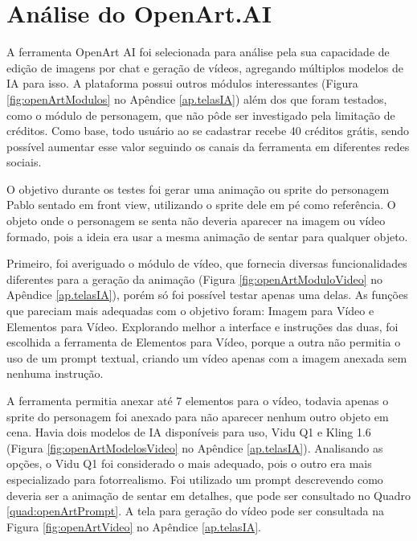 \FloatBarrier
\section{Análise do OpenArt.AI}
\label{s.openArt}

A ferramenta OpenArt AI foi selecionada para análise pela sua capacidade de edição de imagens por chat e geração de vídeos, agregando múltiplos modelos de IA para isso. A plataforma possui outros módulos interessantes (Figura \ref{fig:openArtModulos} no Apêndice \ref{ap.telasIA}) além dos que foram testados, como o módulo de personagem, que não pôde ser investigado pela limitação de créditos. Como base, todo usuário ao se cadastrar recebe 40 créditos grátis, sendo possível aumentar esse valor seguindo os canais da ferramenta em diferentes redes sociais.

O objetivo durante os testes foi gerar uma animação ou sprite do personagem Pablo sentado em front view, utilizando o sprite dele em pé como referência. O objeto onde o personagem se senta não deveria aparecer na imagem ou vídeo formado, pois a ideia era usar a mesma animação de sentar para qualquer objeto.

Primeiro, foi averiguado o módulo de vídeo, que fornecia diversas funcionalidades diferentes para a geração da animação (Figura \ref{fig:openArtModuloVideo} no Apêndice \ref{ap.telasIA}), porém só foi possível testar apenas uma delas. As funções que pareciam mais adequadas com o objetivo foram: Imagem para Vídeo e Elementos para Vídeo. Explorando melhor a interface e instruções das duas, foi escolhida a ferramenta de Elementos para Vídeo, porque a outra não permitia o uso de um prompt textual, criando um vídeo apenas com a imagem anexada sem nenhuma instrução.

A ferramenta permitia anexar até 7 elementos para o vídeo, todavia apenas o sprite do personagem foi anexado para não aparecer nenhum outro objeto em cena. Havia dois modelos de IA disponíveis para uso, Vidu Q1 e Kling 1.6 (Figura \ref{fig:openArtModelosVideo} no Apêndice \ref{ap.telasIA}). Analisando as opções, o Vidu Q1 foi considerado o mais adequado, pois o outro era mais especializado para fotorrealismo. Foi utilizado um prompt descrevendo como deveria ser a animação de sentar em detalhes, que pode ser consultado no Quadro \ref{quad:openArtPrompt}. A tela para geração do vídeo pode ser consultada na Figura \ref{fig:openArtVideo} no Apêndice \ref{ap.telasIA}.

